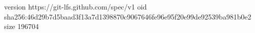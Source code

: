 version https://git-lfs.github.com/spec/v1
oid sha256:46d29b7d5baad3f13a7d1398870c9067646fe96e95f20e99de92539ba981b0e2
size 196704
